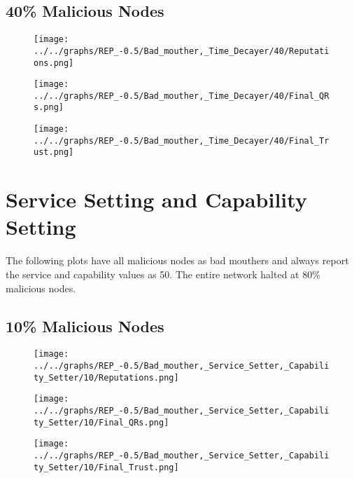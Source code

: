 \begin{minipage}[t]{0.49\columnwidth}
\subsection*{40\% Malicious Nodes}
    \begin{figure}[H]
        \centering
        \texttt{[image: ../../graphs/REP\_-0.5/Bad\_mouther,\_Time\_Decayer/40/Reputations.png]}
    \end{figure}
    \begin{figure}[H]
        \centering
        \texttt{[image: ../../graphs/REP\_-0.5/Bad\_mouther,\_Time\_Decayer/40/Final\_QRs.png]}
    \end{figure}
\end{minipage}
\begin{minipage}[t]{0.49\columnwidth}
    \begin{figure}[H]
        \centering
        \texttt{[image: ../../graphs/REP\_-0.5/Bad\_mouther,\_Time\_Decayer/40/Final\_Trust.png]}
    \end{figure}
\end{minipage}
\newpage

\section*{Service Setting and Capability Setting}
The following plots have all malicious nodes as bad mouthers and always
report the service and capability values as 50. The entire network halted at
80\% malicious nodes.
\\
\begin{minipage}[t]{0.49\columnwidth}
\subsection*{10\% Malicious Nodes}
    \begin{figure}[H]
        \centering
        \texttt{[image: ../../graphs/REP\_-0.5/Bad\_mouther,\_Service\_Setter,\_Capability\_Setter/10/Reputations.png]}
    \end{figure}
    \begin{figure}[H]
        \centering
        \texttt{[image: ../../graphs/REP\_-0.5/Bad\_mouther,\_Service\_Setter,\_Capability\_Setter/10/Final\_QRs.png]}
    \end{figure}
\end{minipage}
\begin{minipage}[t]{0.49\columnwidth}
    \begin{figure}[H]
        \centering
        \texttt{[image: ../../graphs/REP\_-0.5/Bad\_mouther,\_Service\_Setter,\_Capability\_Setter/10/Final\_Trust.png]}
    \end{figure}
\end{minipage}

